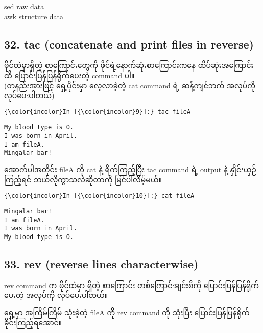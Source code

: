 \documentclass[11pt]{article}
\begin{document}
    sed raw data\\
awk structure data

    \subsection{32. tac (concatenate and print files in
reverse)}\label{tac-concatenate-and-print-files-in-reverse}

ဖိုင်ထဲမှာရှိတဲ့ စာကြောင်းတွေကို ဖိုင်ရဲ့နောက်ဆုံးစာကြောင်းကနေ
ထိပ်ဆုံးအကြောင်းထိ ပြောင်းပြန်ပြန်ရိုက်ပေးတဲ့ command ပါ။\\
(တနည်းအားဖြင့် ရှေ့ပိုင်းမှာ လေ့လာခဲ့တဲ့ cat command ရဲ့ ဆန့်ကျင်ဘက်
အလုပ်ကို လုပ်ပေးပါတယ်)

    \begin{Verbatim}[commandchars=\\\{\}]
{\color{incolor}In [{\color{incolor}9}]:} tac fileA
\end{Verbatim}

    \begin{Verbatim}[commandchars=\\\{\}]
My blood type is O.
I was born in April.
I am fileA.
Mingalar bar!

    \end{Verbatim}

    အောက်ပါအတိုင်း fileA ကို cat နဲ့ ရိက်ကြည့်ပြီး tac command ရဲ့ output
နဲ့ နှိုင်းယှဉ်ကြည့်ရင် ဘယ်လိုကွာသလဲဆိုတာကို မြင်ပါလိမ့်မယ်။

    \begin{Verbatim}[commandchars=\\\{\}]
{\color{incolor}In [{\color{incolor}10}]:} cat fileA
\end{Verbatim}

    \begin{Verbatim}[commandchars=\\\{\}]
Mingalar bar!
I am fileA.
I was born in April.
My blood type is O.

    \end{Verbatim}

    \subsection{33. rev (reverse lines
characterwise)}\label{rev-reverse-lines-characterwise}

rev command က ဖိုင်ထဲမှာ ရှိတဲ့ စာကြောင်း တစ်ကြောင်းချင်းစီကို
ပြောင်းပြန်ပြန်ရိုက်ပေးတဲ့ အလုပ်ကို လုပ်ပေးပါတယ်။

ရှေ့မှာ အကြိမ်ကြိမ် သုံးခဲ့တဲ့ fileA ကို rev command ကို သုံးပြီး
ပြောင်းပြန်ပြန်ရိုက်ခိုင်းကြည့်ရအောင်။
\end{document}
